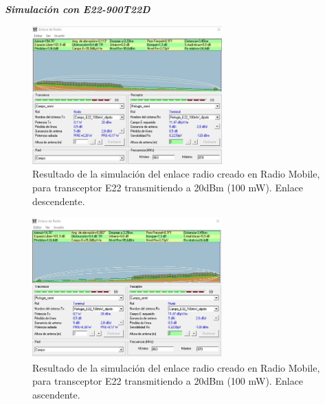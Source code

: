 \documentclass[12pt]{article}
\begin{document}
	\pagebreak
	
	\noindent \textit{\textbf{Simulación con E22-900T22D}} \\
	
	\begin{figure}[h!]
		\begin{center}
			\includegraphics[width=0.65\textwidth]{img/resultado_e22_100mW_desc.png}
			\caption{Resultado de la simulación del enlace radio creado en Radio Mobile, para transceptor E22 transmitiendo a 20dBm (100 mW). Enlace descendente.}
			\label{fig: resultado enlace e22 100mW descendente radio mobile}
		\end{center}
	\end{figure}
	
	
	
	\begin{figure}[h!]
		\begin{center}
			\includegraphics[width=0.65\textwidth]{img/resultado_e22_100mW_asc.png}
			\caption{Resultado de la simulación del enlace radio creado en Radio Mobile, para transceptor E22 transmitiendo a 20dBm (100 mW). Enlace ascendente.}
			\label{fig: resultado enlace e22 100mW ascendente radio mobile}
		\end{center}
	\end{figure} 
	
\end{document}
